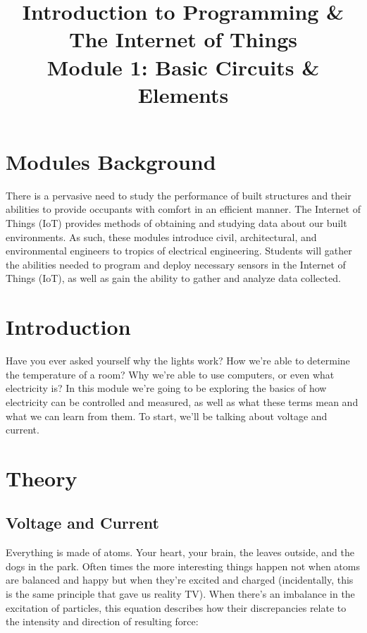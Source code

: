 \documentclass[a4paper]{article}
\title{ \textbf{Introduction to Programming \& The Internet of Things} \\
Module 1: Basic Circuits \& Elements \vspace{-5ex} \\
}
\date{}
\begin{document}
\maketitle
\thispagestyle{fancy}

\section{Modules Background}
There is a pervasive need to study the performance of built structures and their abilities to provide occupants with comfort in an efficient manner. The Internet of Things (IoT) provides methods of obtaining and studying data about our built environments. As such, these modules introduce civil, architectural, and environmental engineers to tropics of electrical engineering. Students will gather the abilities needed to program and deploy necessary sensors in the Internet of Things (IoT), as well as gain the ability to gather and analyze data collected.

\tableofcontents
\newpage

\section{Introduction}
\label{sec:introduction}

Have you ever asked yourself why the lights work? How we're able to determine the temperature of a room? Why we're able to use computers, or even what electricity is? In this module we're going to be exploring the basics of how electricity can be controlled and measured, as well as what these terms mean and what we can learn from them. To start, we'll be talking about voltage and current.

\section{Theory}
\label{sec:theory}

\subsection{Voltage and Current}
Everything is made of atoms. Your heart, your brain, the leaves outside, and the dogs in the park. Often times the more interesting things happen not when atoms are balanced and happy but when they're excited and charged (incidentally, this is the same principle that gave us reality TV). When there's an imbalance in the excitation of particles, this equation describes how their discrepancies relate to the intensity and direction of resulting force: 
\end{document}

